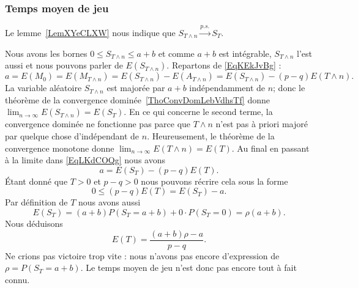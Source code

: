 \subsubsection{Temps moyen de jeu}

Le lemme~\ref{LemXYeCLXW} nous indique que \( S_{T\wedge n}\stackrel{p.s.}{\longrightarrow}S_T\).

Nous avons les bornes \( 0\leq S_{T\wedge n}\leq a+b\) et comme \( a+b\) est intégrable, \( S_{T\wedge n}\) l'est aussi et nous pouvons parler de \( E(S_{T\wedge n})\). Repartons de \eqref{EqKEkJvBg} :
\begin{equation}    \label{EqLKdCOQg}
	a=E(M_0)=E(M_{T\wedge n})=E(S_{T\wedge n})-E(A_{T\wedge n})=E(S_{T\wedge n})-(p-q)E(T\wedge n).
\end{equation}
La variable aléatoire \( S_{T\wedge n}\) est majorée par \( a+b\) indépendamment de \( n\); donc le théorème de la convergence dominée~\ref{ThoConvDomLebVdhsTf} donne \( \lim_{n\to \infty} E(S_{T\wedge n})=E(S_T)\). En ce qui concerne le second terme, la convergence dominée ne fonctionne pas parce que \( T\wedge n\) n'est pas à priori majoré par quelque chose d'indépendant de \( n\). Heureusement, le théorème de la convergence monotone donne \( \lim_{n\to \infty} E(T\wedge n)=E(T)\). Au final en passant à la limite dans \eqref{EqLKdCOQg} nous avons
\begin{equation}
	a=E(S_T)-(p-q)E(T).
\end{equation}
Étant donné que \( T>0\) et \( p-q>0\) nous pouvons récrire cela sous la forme
\begin{equation}
	0\leq (p-q)E(T)=E(S_T)-a.
\end{equation}
Par définition de \( T\) nous avons aussi
\begin{equation}
	E(S_T)=(a+b)P(S_T=a+b)+0\cdot P(S_T=0)=\rho(a+b).
\end{equation}
Nous déduisons
\begin{equation}    \label{EqRHUVuKv}
	E(T)=\frac{ (a+b)\rho-a }{ p-q }.
\end{equation}
Ne crions pas victoire trop vite : nous n'avons pas encore d'expression de \( \rho=P(S_T=a+b)\). Le temps moyen de jeu n'est donc pas encore tout à fait connu.

